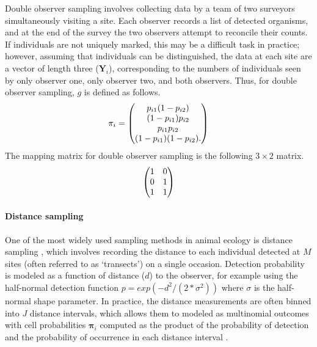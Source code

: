 \documentclass[article,shortnames]{jss}
\begin{document}
Double observer sampling involves collecting data by a team of two surveyors
simultaneously visiting a site.  Each observer records a list of detected 
organisms, and at the end of the survey the two observers attempt to reconcile
their counts.  If individuals are not uniquely marked, this may be a difficult 
task in practice; however, assuming that individuals can be distinguished, the 
data at each site are a vector of length three ($\mathbf Y_i$),
corresponding to the numbers of individuals seen by only observer one,
only observer two, and both observers.  Thus, for double observer sampling, 
$g$ is defined as follows.
\begin{equation}
  \mathbf \pi_i =
  \begin{pmatrix}
    p_{i1}(1-p_{i2}) \\
    (1-p_{i1})p_{i2} \\
    p_{i1}p_{i2} \\
    (1-p_{i1})(1-p_{i2}).
  \end{pmatrix} \notag
\end{equation}
The  mapping matrix for double observer sampling is the
following $3 \times 2$ matrix.
\begin{equation}
  \begin{pmatrix}
    1 & 0 \\
    0 & 1 \\
    1 & 1 
  \end{pmatrix} \notag
\end{equation}

\paragraph{Distance sampling}
\label{sec:distsamp}

One of the most widely used sampling methods in animal ecology is 
distance sampling \citep{BucklandEA01}, which involves recording the 
distance to each individual detected at $M$ sites (often referred to as 
`transects') on a single occasion.  
Detection probability is modeled as a function of distance ($d$) to the observer, 
for example using the half-normal detection function 
$p = exp(-d^2/(2*\sigma^2))$ where $\sigma$ is the half-normal shape 
parameter.  In practice, the distance measurements are often binned into 
$J$ distance intervals, which allows them to modeled as multinomial 
outcomes with cell probabilities $\mathbf \pi_i$ computed as the product of the 
probability of detection and the probability of 
occurrence in each distance interval \citep{Royle2004b}.  
\end{document}
